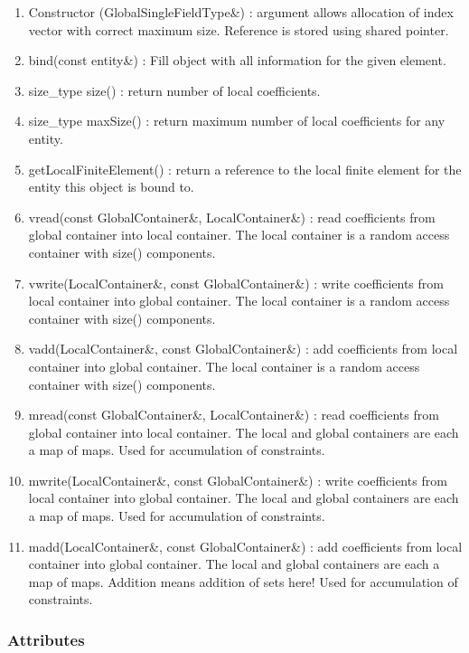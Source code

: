 \documentclass[11pt,a4paper,DIV11,%
notitlepage,oneside,abstracton,%
bibtotoc]{scrartcl}
\begin{document}
\begin{enumerate}[1)]
\item Constructor (GlobalSingleFieldType\&) : argument allows
  allocation of index vector with correct maximum size. Reference is
  stored using shared pointer.
\item bind(const entity\&) : Fill object with all information for the
  given element.
\item size\_type size() : return number of local coefficients.
\item size\_type maxSize() : return maximum number of local
  coefficients for any entity.
\item getLocalFiniteElement() : return a reference to the local finite
  element for the entity this object is bound to.
\item vread(const GlobalContainer\&, LocalContainer\&) : read
  coefficients from global container into local container. The local
  container is a random access container with size() components.
\item vwrite(LocalContainer\&, const GlobalContainer\&) : write
  coefficients from local container into global container. The local
  container is a random access container with size() components.
\item vadd(LocalContainer\&, const GlobalContainer\&) : add
  coefficients from local container into global container. The local
  container is a random access container with size() components.
\item mread(const GlobalContainer\&, LocalContainer\&) : read
  coefficients from global container into local container. The local
  and global containers are each a map of maps. Used for accumulation
  of constraints.
\item mwrite(LocalContainer\&, const GlobalContainer\&) : write
  coefficients from local container into global container. The local
  and global containers are each a map of maps.  Used for accumulation
  of constraints.
\item madd(LocalContainer\&, const GlobalContainer\&) : add
  coefficients from local container into global container. The local
  and global containers are each a map of maps. Addition means
  addition of sets here!  Used for accumulation
  of constraints.
 \end{enumerate}

\subsubsection{Attributes}
\end{document}

